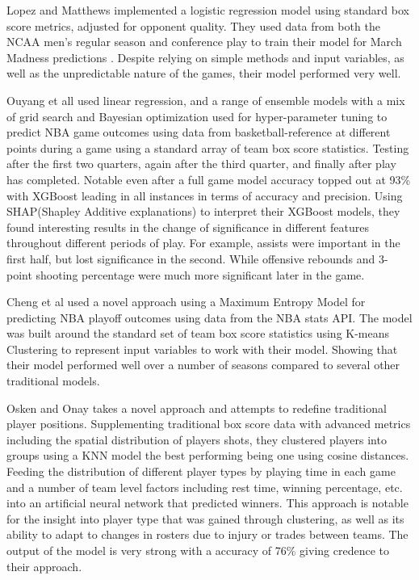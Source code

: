 \documentclass[11pt]{article}
\begin{document}
Lopez and Matthews implemented a logistic regression model using standard box score metrics, adjusted for opponent quality. They used data from both the NCAA men’s regular season and conference play to train their model for March Madness predictions \cite{lopez_building_2015}. Despite relying on simple methods and input variables, as well as the unpredictable nature of the games, their model performed very well.

\medskip

Ouyang et all used linear regression, and a range of ensemble models with a mix of grid search and Bayesian optimization used for hyper-parameter tuning to predict NBA game outcomes using data from basketball-reference at different points during a game using a standard array of team box score statistics. Testing after the first two quarters, again after the third quarter, and finally after play has completed. Notable even after a full game model accuracy topped out at 93\% \cite{Ouyang_Li_Zhou_Wei_Zheng_Feng_Peng_2024} with XGBoost leading in all instances in terms of accuracy and precision. Using SHAP(Shapley Additive explanations) to interpret their XGBoost models, they found interesting results in the change of significance in different features throughout different periods of play.  For example, assists were important in the first half, but lost significance in the second. While offensive rebounds and 3-point shooting percentage were much more significant later in the game. 

\medskip

Cheng et al used a novel approach using a Maximum Entropy Model for predicting NBA playoff outcomes using data from the NBA stats API. The model was built around the standard set of team box score statistics using K-means Clustering to represent input variables to work with their model. Showing that their model performed well over a number of seasons compared to several other traditional models. 

\medskip

Osken and Onay  takes a novel approach and attempts to redefine traditional player positions. Supplementing traditional box score data with advanced metrics including the spatial distribution of players shots, they clustered players into groups using a KNN model the best performing being one using cosine distances. Feeding the distribution of different player types by playing time in each game and a number of team level factors including rest time, winning percentage, etc. into an artificial neural network that predicted winners. This approach is notable for the insight into player type that was gained through clustering, as well as its ability to adapt to changes in rosters due to injury or trades between teams. The output of the model is very strong with a accuracy of 76\% \cite{Osken_Onay_2022} giving credence to their approach. 
\end{document}
